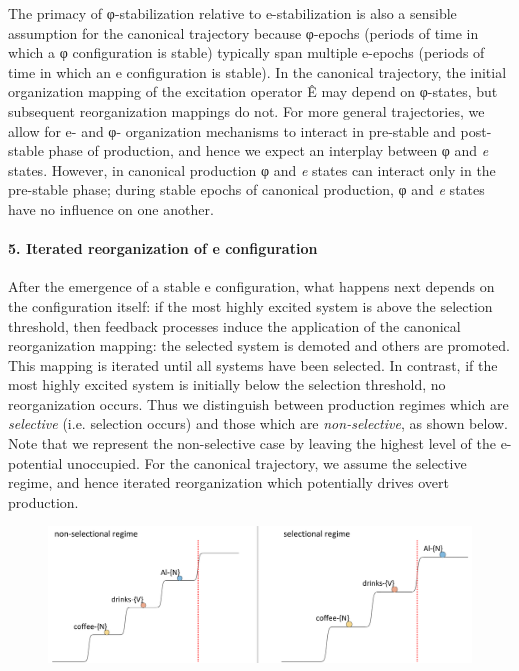   The primacy of φ-stabilization relative to e-stabilization is also a sensible assumption for the canonical trajectory because φ-epochs (periods of time in which a φ configuration is stable) typically span multiple e-epochs (periods of time in which an e configuration is stable). In the canonical trajectory, the initial organization mapping of the excitation operator Ê may depend on φ-states, but subsequent reorganization mappings do not. For more general trajectories, we allow for e- and φ- organization mechanisms to interact in pre-stable and post-stable phase of production, and hence we expect an interplay between φ and \textit{e} states. However, in canonical production φ and \textit{e} states can interact only in the pre-stable phase; during stable epochs of canonical production, φ and \textit{e} states have no influence on one another. 

\paragraph{5. Iterated reorganization of e configuration}

After the emergence of a stable e configuration, what happens next depends on the configuration itself: if the most highly excited system is above the selection threshold, then feedback processes induce the application of the canonical reorganization mapping: the selected system is demoted and others are promoted. This mapping is iterated until all systems have been selected. In contrast, if the most highly excited system is initially below the selection threshold, no reorganization occurs. Thus we distinguish between production regimes which are \textit{selective} (i.e. selection occurs) and those which are \textit{non-selective}, as shown below. Note that we represent the non-selective case by leaving the highest level of the e-potential unoccupied. For the canonical trajectory, we assume the selective regime, and hence iterated reorganization which potentially drives overt production. 

  
\begin{figure}
\includegraphics[width=\textwidth]{figures/Tilsen-img53.png}
\caption{\missingcaption}
\label{fig:}
\end{figure}
 

